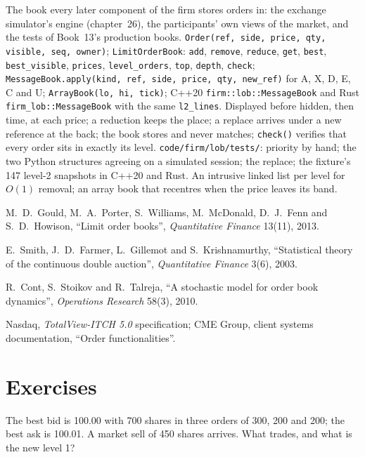\begin{build}
 The book every later component of the firm stores orders in: the exchange simulator's engine (chapter~26), the participants'
own views of the market, and the tests of Book~13's production books.
 \texttt{Order(ref, side, price, qty, visible, seq, owner)}; \texttt{LimitOrderBook}: \texttt{add}, \texttt{remove}, \texttt{reduce},
\texttt{get}, \texttt{best}, \texttt{best\_visible}, \texttt{prices}, \texttt{level\_orders}, \texttt{top}, \texttt{depth}, \texttt{check};
\texttt{MessageBook.apply(kind, ref, side, price, qty, new\_ref)} for A, X, D, E, C and U; \texttt{ArrayBook(lo, hi, tick)}; C++20
\texttt{firm::lob::MessageBook} and Rust \texttt{firm\_lob::MessageBook} with the same \texttt{l2\_lines}.
 Displayed before hidden, then time, at each price; a reduction keeps the place; a replace arrives under a new reference at the back;
the book stores and never matches; \texttt{check()} verifies that every order sits in exactly its level.
 \texttt{code/firm/lob/tests/}: priority by hand; the two Python structures agreeing on a simulated session; the replace;
the fixture's 147 level-2 snapshots in C++20 and Rust.
 An intrusive linked list per level for $O(1)$ removal; an array book that recentres when the price leaves its band.
\end{build}

\begin{omsources}
\item M.~D.~Gould, M.~A.~Porter, S.~Williams, M.~McDonald, D.~J.~Fenn and S.~D.~Howison, ``Limit order books'', \emph{Quantitative Finance}
13(11), 2013.
\item E.~Smith, J.~D.~Farmer, L.~Gillemot and S.~Krishnamurthy, ``Statistical theory of the continuous double auction'', \emph{Quantitative
Finance} 3(6), 2003.
\item R.~Cont, S.~Stoikov and R.~Talreja, ``A stochastic model for order book dynamics'', \emph{Operations Research} 58(3), 2010.
\item Nasdaq, \emph{TotalView-ITCH 5.0} specification; CME Group, client systems documentation, ``Order functionalities''.
\end{omsources}

\section{Exercises}

\begin{exercise}[$\star$]\label{exo:mx:the-limit-order-book:1}
The best bid is 100.00 with 700 shares in three orders of 300, 200 and 200; the best ask is 100.01. A market sell of 450 shares arrives. What trades,
and what is the new level 1?
\end{exercise}

